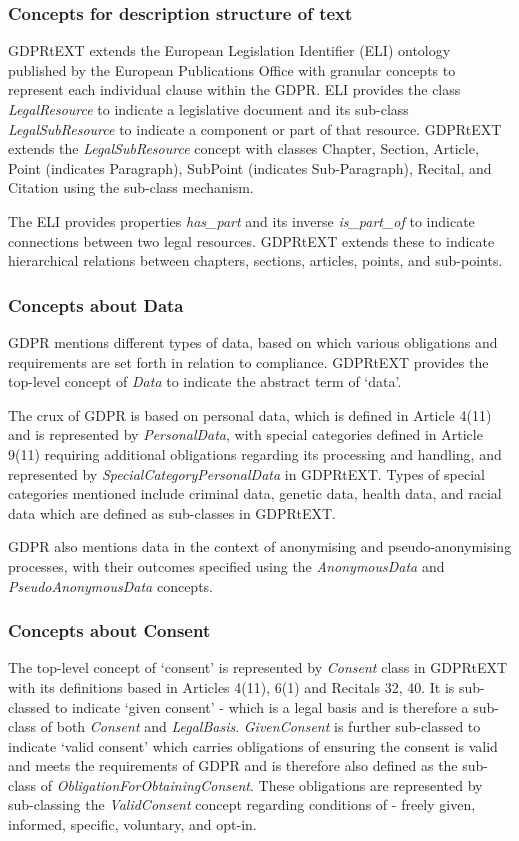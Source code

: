 \subsubsection{Concepts for description structure of text}
GDPRtEXT extends the European Legislation Identifier (ELI) \cite{} ontology published by the European Publications Office with granular concepts to represent each individual clause within the GDPR. 
ELI provides the class \textit{LegalResource} to indicate a legislative document and its sub-class \textit{LegalSubResource} to indicate a component or part of that resource. GDPRtEXT extends the \textit{LegalSubResource} concept with classes Chapter, Section, Article, Point (indicates Paragraph), SubPoint (indicates Sub-Paragraph), Recital, and Citation using the sub-class mechanism.

The ELI provides properties \textit{has\_part} and its inverse \textit{is\_part\_of} to indicate connections between two legal resources. GDPRtEXT extends these to indicate hierarchical relations between chapters, sections, articles, points, and sub-points.

\subsubsection{Concepts about Data}
GDPR mentions different types of data, based on which various obligations and requirements are set forth in relation to compliance. GDPRtEXT provides the top-level concept of \textit{Data} to indicate the abstract term of `data'.

The crux of GDPR is based on personal data, which is defined in Article 4(11) and is represented by  \textit{PersonalData}, with special categories defined in Article 9(11) requiring additional obligations regarding its processing and handling, and represented by \textit{SpecialCategoryPersonalData} in GDPRtEXT. Types of special categories mentioned include criminal data, genetic data, health data, and racial data which are defined as sub-classes in GDPRtEXT.

GDPR also mentions data in the context of anonymising and pseudo-anonymising processes, with their outcomes specified using the \textit{AnonymousData} and \textit{PseudoAnonymousData} concepts.

\subsubsection{Concepts about Consent}
The top-level concept of `consent' is represented by \textit{Consent} class in GDPRtEXT with its definitions based in Articles 4(11), 6(1) and Recitals 32, 40. It is sub-classed to indicate `given consent' - which is a legal basis and is therefore a sub-class of both \textit{Consent} and \textit{LegalBasis}. \textit{GivenConsent} is further sub-classed to indicate `valid consent' which carries obligations of ensuring the consent is valid and meets the requirements of GDPR and is therefore also defined as the sub-class of \textit{ObligationForObtainingConsent}. These obligations are represented by sub-classing the \textit{ValidConsent} concept regarding conditions of - freely given, informed, specific, voluntary, and opt-in.

